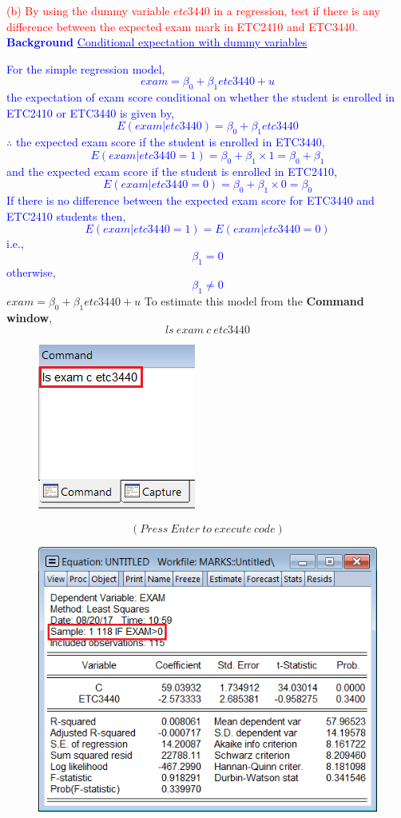 \documentclass[12pt]{report}
\newenvironment{blueframed}[1][blue]
{\def\FrameCommand{\fboxsep=\FrameSep\fcolorbox{#1}{white}}%
	\MakeFramed {\advance\hsize-\width \FrameRestore}}
{\endMakeFramed}
\begin{document}
\newpage
\noindent \textcolor{red}
{
	(b) By using the dummy variable $etc3440$ in a regression, test if there is any difference between the expected exam mark in ETC2410 and ETC3440.
}
\justify
\begin{blueframed}
	\textcolor{blue}{\textbf{Background}}
	\vspace{-\baselineskip}
	\justify
	\textcolor{blue}{\underline{Conditional expectation with dummy variables}}
	
	\noindent \textcolor{blue}{For the simple regression model,$$exam = \beta_0 + \beta_1etc3440 + u$$ the expectation of exam score conditional on whether the student is enrolled in ETC2410 or ETC3440 is given by,
		$$E(exam|etc3440) = \beta_0 + \beta_1etc3440$$
		$\therefore$ the expected exam score if the student is enrolled in ETC3440, $$E(exam|etc3440=1) = \beta_0 + \beta_1{\times}1 = \beta_0 + \beta_1$$
		and the expected exam score if the student is enrolled in ETC2410, $$E(exam|etc3440=0) = \beta_0 + \beta_1{\times}0 = \beta_0$$ If there is no difference between the expected exam score for ETC3440 and ETC2410 students then, $$E(exam|etc3440=1) = E(exam|etc3440=0)$$ i.e.,
		$$\beta_1 = 0$$
		otherwise,
		$$\beta_1 \neq 0$$
	}
\end{blueframed}
\centering $exam = \beta_0 + \beta_1etc3440 + u$
\justify \noindent To estimate this model from the \textbf{Command window},
$$ls\ exam\ c\ etc3440$$
\begin{figure}[H]
	\centering
	\includegraphics{q1_6}
\end{figure}
\vspace{-\baselineskip}
$$(Press\ Enter\ to\ execute\ code)$$
\begin{figure}[H]
	\centering
	\includegraphics{q1_7}
\end{figure}
\end{document}

